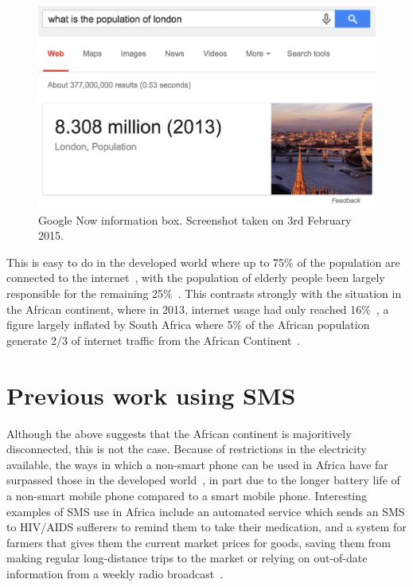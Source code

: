\documentclass[authoryearcitations]{UoYCSproject}
\begin{document}
\begin{figure}[htb] 
\includegraphics[width=\linewidth]{googleInstant}
\caption{Google Now information box.  Screenshot taken on 3rd February 2015.}
\label{fig:googleInstant}
\end{figure}

This is easy to do in the developed world where up to 75\% of the population are connected to the internet~\cite{ITU_Cell_Usage_2013}, with the population of elderly people been largely responsible for the remaining 25\%~\cite{Gov_Internet_Usage_UK_2014}.  This contrasts strongly with the situation in the African continent, where in 2013, internet usage had only reached 16\%~\cite{ITU_Cell_Usage_2013}, a figure largely inflated by South Africa where 5\% of the African population generate 2/3 of internet traffic from the African Continent~\cite{ITU_Cell_Usage_2013}.

\section{Previous work using SMS}
Although the above suggests that the African continent is majoritively disconnected, this is not the case.  Because of restrictions in the electricity available, the ways in which a non-smart phone can be used in Africa have far surpassed those in the developed world~\cite{Fox:2011:Online}, in part due to the longer battery life of a non-smart mobile phone compared to a smart mobile phone.  Interesting examples of SMS use in Africa include an automated service which sends an SMS to HIV/AIDS sufferers to remind them to take their medication, and a system for farmers that gives them the current market prices for goods, saving them from making regular long-distance trips to the market or relying on out-of-date information from a weekly radio broadcast~\cite{Aker_Mobile_Phones_2010}.
\end{document}
